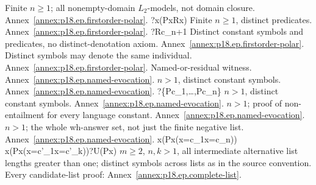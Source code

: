  {Finite \(n\geq1\); all nonempty-domain \(L_2\)-models, not domain closure.
  Annex~\ref{annex:p18.ep.firstorder-polar}.}
 {?\forall x(Px\supset Rx)}
 {Finite \(n\geq1\), distinct predicates. Annex~\ref{annex:p18.ep.firstorder-polar}.}
 {?Rc_{n+1}}
 {Distinct constant symbols and predicates, no distinct-denotation axiom.
  Annex~\ref{annex:p18.ep.firstorder-polar}.}
 {Distinct symbols may denote the same individual. Annex~\ref{annex:p18.ep.firstorder-polar}.}
 {Named-or-residual witness. Annex~\ref{annex:p18.ep.named-evocation}.}
 {\(n>1\), distinct constant symbols. Annex~\ref{annex:p18.ep.named-evocation}.}
 {?\{\neg Pc_1,\ldots,\neg Pc_n\}}
 {\(n>1\), distinct constant symbols. Annex~\ref{annex:p18.ep.named-evocation}.}
 {\(n>1\); proof of non-entailment for every language constant.
  Annex~\ref{annex:p18.ep.named-evocation}.}
 {\(n>1\); the whole wh-answer set, not just the finite negative list.
  Annex~\ref{annex:p18.ep.named-evocation}.}
 {\forall x(Px\equiv(x=c_1\lor\cdots\lor x=c_n))\lor\cdots\lor
  \forall x(Px\equiv(x=c'_1\lor\cdots\lor x=c'_k))}{?U(Px)}
 {\(m\geq2\), \(n,k>1\), all intermediate alternative list lengths
  greater than one; distinct
  symbols across lists as in the source convention. Every candidate-list
  proof: Annex~\ref{annex:p18.ep.complete-list}.}

